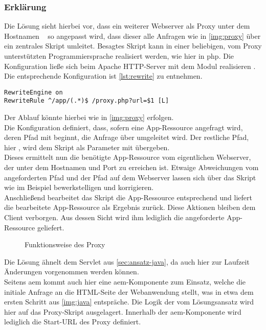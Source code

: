 \subsubsection{Erklärung}
Die Lösung sieht hierbei vor, dass ein weiterer Webserver als Proxy unter dem Hostnamen \hostnameP~ so angepasst wird, dass dieser alle Anfragen wie in \autoref{img:proxy} über ein zentrales Skript umleitet. Besagtes Skript kann in einer beliebigen, vom Proxy unterstützten Programmiersprache realisiert werden, wie hier in \acs{php}. Die Konfiguration ließe sich beim Apache HTTP-Server mit dem Modul  realisieren \cite{Foundation2017a}. Die entsprechende Konfiguration ist \autoref{lst:rewrite} zu entnehmen. \\
\begin{minipage}{\textwidth}
\begin{lstlisting}[style=jcr, caption=Konfiguration des mod\_rewrite Modules für den Proxy-Lösungsansatz, label=lst:rewrite]
RewriteEngine on
RewriteRule ^/app/(.*)$ /proxy.php?url=$1 [L]
\end{lstlisting}
\end{minipage}
Der Ablauf könnte hierbei wie in \autoref{img:proxy} erfolgen. \\
Die Konfiguration definiert, dass, sofern eine App-Ressource angefragt wird, deren Pfad mit  beginnt, die Anfrage über  umgeleitet wird. Der restliche Pfad, hier , wird dem Skript als Parameter mit übergeben.\\
Dieses ermittelt nun die benötigte App-Ressource vom eigentlichen Webserver, der unter dem Hostnamen und Port  zu erreichen ist. Etwaige Abweichungen vom angeforderten Pfad und der Pfad auf dem Webserver lassen sich über das Skript wie im Beispiel bewerkstelligen und korrigieren.\\
Anschließend bearbeitet das Skript die App-Ressource entsprechend und liefert die bearbeitete App-Ressource als Ergebnis zurück. Diese Aktionen bleiben dem Client verborgen. Aus dessen Sicht wird ihm lediglich die angeforderte App-Ressource geliefert. \\

\begin{figure}[H]
	\begin{center}
		{\footnotesize}
		\caption{Funktionsweise des Proxy}
		\label{img:proxy}
	\end{center}
\end{figure}

Die Lösung ähnelt dem Servlet aus \autoref{sec:ansatz-java}, da auch hier zur Laufzeit Änderungen vorgenommen werden können.\\
Seitens \ac{aem} kommt auch hier eine \ac{aem}-Komponente zum Einsatz, welche die initiale Anfrage an die HTML-Seite der Webanwendung stellt, was in etwa dem ersten Schritt aus \autoref{img:java} entspräche. Die Logik der \ajc vom Lösungsansatz  wird hier auf das Proxy-Skript ausgelagert. Innerhalb der \ac{aem}-Komponente wird lediglich die Start-URL des Proxy definiert.
